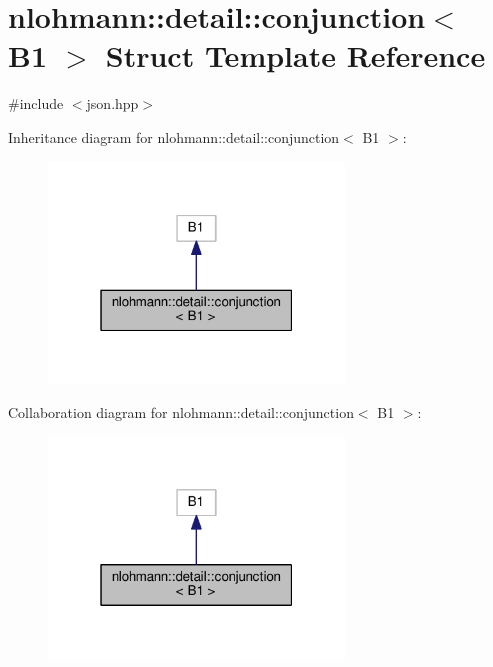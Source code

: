 \hypertarget{structnlohmann_1_1detail_1_1conjunction_3_01_b1_01_4}{}\section{nlohmann\+:\+:detail\+:\+:conjunction$<$ B1 $>$ Struct Template Reference}
\label{structnlohmann_1_1detail_1_1conjunction_3_01_b1_01_4}


{\ttfamily \#include $<$json.\+hpp$>$}



Inheritance diagram for nlohmann\+:\+:detail\+:\+:conjunction$<$ B1 $>$\+:\nopagebreak
\begin{figure}[H]
\begin{center}
\leavevmode
\includegraphics[width=223pt]{structnlohmann_1_1detail_1_1conjunction_3_01_b1_01_4__inherit__graph}
\end{center}
\end{figure}


Collaboration diagram for nlohmann\+:\+:detail\+:\+:conjunction$<$ B1 $>$\+:\nopagebreak
\begin{figure}[H]
\begin{center}
\leavevmode
\includegraphics[width=223pt]{structnlohmann_1_1detail_1_1conjunction_3_01_b1_01_4__coll__graph}
\end{center}
\end{figure}


